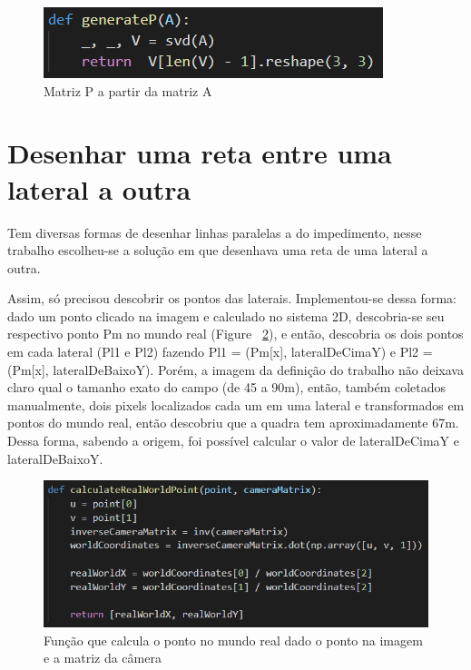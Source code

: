 \documentclass{article}
\begin{document}
        \begin{figure}[h!]
        \includegraphics[scale=1]{matrizP.PNG}
        \caption{Matriz P a partir da matriz A}
        \label{fig:matrizP}
        \end{figure}
        
    \section{Desenhar uma reta entre uma lateral a outra}
    Tem diversas formas de desenhar linhas paralelas a do impedimento, nesse trabalho escolheu-se a solução em que desenhava uma reta de uma lateral a outra. 
    
    Assim, só precisou descobrir os pontos das laterais. Implementou-se dessa forma: dado um ponto clicado na imagem e calculado no sistema 2D, descobria-se seu respectivo ponto Pm no mundo real (Figure ~\ref{fig:calculateRealWorldPoint}), e então, descobria os dois pontos em cada lateral (Pl1 e Pl2) fazendo Pl1 = (Pm[x], lateralDeCimaY) e Pl2 = (Pm[x], lateralDeBaixoY). Porém, a imagem da definição do trabalho não deixava claro qual o tamanho exato do campo (de 45 a 90m), então, também coletados manualmente, dois pixels localizados cada um em uma lateral e transformados em pontos do mundo real, então descobriu que a quadra tem aproximadamente 67m. Dessa forma, sabendo a origem, foi possível calcular o valor de lateralDeCimaY e lateralDeBaixoY.
    
        \begin{figure}[h!]
        \includegraphics[scale=0.9]{calculateRealWorldPoint.PNG}
        \caption{Função que calcula o ponto no mundo real dado o ponto na imagem e a matriz da câmera}
        \label{fig:calculateRealWorldPoint}
        \end{figure}
        
\end{document}
